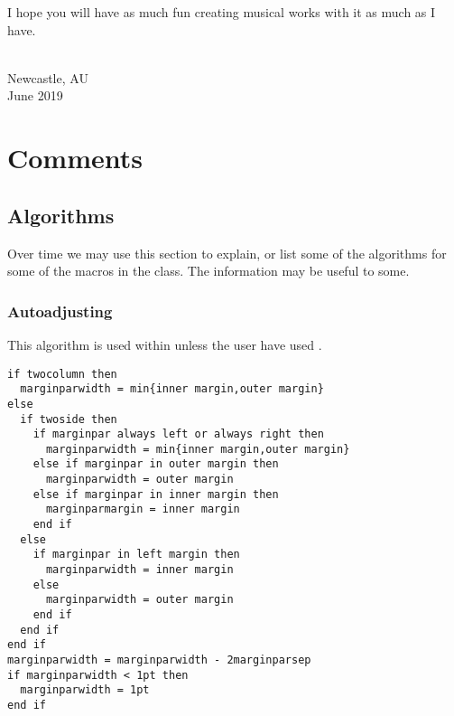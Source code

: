 \documentclass[10pt,a4paper,extrafontsizes]{memoir}
\newcommand\svnidlong[4]{}
\begin{document}
	I hope you will have as much fun creating musical works with it as much as I have.
{ \\ Newcastle, AU \\ June 2019\par}




\svnidlong
{$Ignore: $}
{$LastChangedDate: 2015-04-22 17:17:51 +0200 (Wed, 22 Apr 2015) $}
{$LastChangedRevision: 527 $}
{$LastChangedBy: daleif $}






\cleardoublepage
{}

\mainmatter









\chapter{Comments}
\label{cha:comments}

\section{Algorithms}
\label{sec:algorithms}

Over time we may use this section to explain, or list some of the
algorithms for some of the macros in the class. The information may be
useful to some.

\subsection{Autoadjusting
  \texorpdfstring{}{\textbackslash marginparwidth}}
\label{sec:auto-csmarg}

This algorithm is used within \cmd{\fixthelayout} unless the user have
used \cmd{\setmarginnotes}.

\noindent
\begin{framed}
  \baselineskip
  \begin{small}
\begin{verbatim}
if twocolumn then
  marginparwidth = min{inner margin,outer margin}
else
  if twoside then
    if marginpar always left or always right then
      marginparwidth = min{inner margin,outer margin}
    else if marginpar in outer margin then
      marginparwidth = outer margin
    else if marginpar in inner margin then
      marginparmargin = inner margin
    end if
  else
    if marginpar in left margin then
      marginparwidth = inner margin
    else
      marginparwidth = outer margin
    end if
  end if
end if
marginparwidth = marginparwidth - 2marginparsep
if marginparwidth < 1pt then
  marginparwidth = 1pt
end if
\end{verbatim}
  \end{small}
\end{framed}
\end{document}
